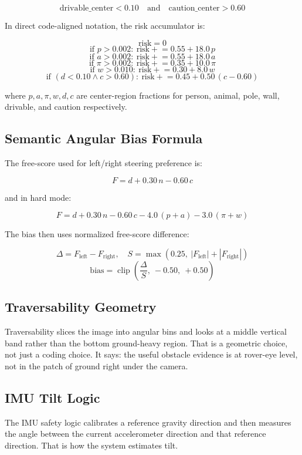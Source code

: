 \documentclass[11pt]{article}
\begin{document}
\[
\text{drivable\_center} < 0.10
\quad \text{and} \quad
\text{caution\_center} > 0.60
\]

In direct code-aligned notation, the risk accumulator is:

\[
\text{risk} = 0
\]
\[
\text{if } p > 0.002:\ \text{risk} \mathrel{+}= 0.55 + 18.0\,p
\]
\[
\text{if } a > 0.002:\ \text{risk} \mathrel{+}= 0.55 + 18.0\,a
\]
\[
\text{if } \pi > 0.002:\ \text{risk} \mathrel{+}= 0.35 + 10.0\,\pi
\]
\[
\text{if } w > 0.010:\ \text{risk} \mathrel{+}= 0.30 + 8.0\,w
\]
\[
\text{if } (d < 0.10 \land c > 0.60):\ \text{risk} \mathrel{+}= 0.45 + 0.50\,(c-0.60)
\]

where \(p,a,\pi,w,d,c\) are center-region fractions for person, animal, pole, wall,
drivable, and caution respectively.

\subsection{Semantic Angular Bias Formula}

The free-score used for left/right steering preference is:

\[
F = d + 0.30\,n - 0.60\,c
\]

and in hard mode:

\[
F = d + 0.30\,n - 0.60\,c - 4.0\,(p+a) - 3.0\,(\pi+w)
\]

The bias then uses normalized free-score difference:

\[
\Delta = F_{\text{left}} - F_{\text{right}},\quad
S = \max(0.25,\ |F_{\text{left}}| + |F_{\text{right}}|)
\]
\[
\text{bias} = \operatorname{clip}\!\left(\frac{\Delta}{S},\ -0.50,\ +0.50\right)
\]

\subsection{Traversability Geometry}

Traversability slices the image into angular bins and looks at a middle vertical
band rather than the bottom ground-heavy region. That is a geometric choice, not
just a coding choice. It says: the useful obstacle evidence is at rover-eye level,
not in the patch of ground right under the camera.

\subsection{IMU Tilt Logic}

The IMU safety logic calibrates a reference gravity direction and then measures the
angle between the current accelerometer direction and that reference direction. That
is how the system estimates tilt.
\end{document}
